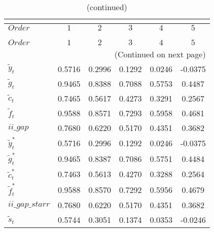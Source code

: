  
\begin{center}
\begin{longtable}{lccccc} 
\caption{COEFFICIENTS OF AUTOCORRELATION}\\
 \label{Table:th_autocorr_matrix}\\
\toprule 
$Order                    $	 & 	 $         1$	 & 	 $         2$	 & 	 $         3$	 & 	 $         4$	 & 	 $         5$\\
\midrule \endfirsthead 
\caption{(continued)}\\
 \toprule \\ 
$Order                    $	 & 	 $         1$	 & 	 $         2$	 & 	 $         3$	 & 	 $         4$	 & 	 $         5$\\
\midrule \endhead 
\midrule \multicolumn{6}{r}{(Continued on next page)} \\ \bottomrule \endfoot 
\bottomrule \endlastfoot 
${\tilde y_t}             $	 & 	    0.5716	 & 	    0.2996	 & 	    0.1292	 & 	    0.0246	 & 	   -0.0375 \\ 
${\tilde g_t}             $	 & 	    0.9465	 & 	    0.8388	 & 	    0.7088	 & 	    0.5753	 & 	    0.4487 \\ 
${\tilde c_t}             $	 & 	    0.7465	 & 	    0.5617	 & 	    0.4273	 & 	    0.3291	 & 	    0.2567 \\ 
${\tilde f_t}             $	 & 	    0.9588	 & 	    0.8571	 & 	    0.7293	 & 	    0.5958	 & 	    0.4681 \\ 
$ii\_gap                  $	 & 	    0.7680	 & 	    0.6220	 & 	    0.5170	 & 	    0.4351	 & 	    0.3682 \\ 
${\tilde y_t^*}           $	 & 	    0.5716	 & 	    0.2996	 & 	    0.1292	 & 	    0.0246	 & 	   -0.0375 \\ 
${\tilde g_t^*}           $	 & 	    0.9465	 & 	    0.8387	 & 	    0.7086	 & 	    0.5751	 & 	    0.4484 \\ 
${\tilde c_t^*}           $	 & 	    0.7463	 & 	    0.5613	 & 	    0.4270	 & 	    0.3288	 & 	    0.2564 \\ 
${\tilde f_t^*}           $	 & 	    0.9588	 & 	    0.8570	 & 	    0.7292	 & 	    0.5956	 & 	    0.4679 \\ 
$ii\_gap\_starr           $	 & 	    0.7680	 & 	    0.6220	 & 	    0.5170	 & 	    0.4351	 & 	    0.3682 \\ 
${\tilde s_t}             $	 & 	    0.5744	 & 	    0.3051	 & 	    0.1374	 & 	    0.0353	 & 	   -0.0246 \\ 

\end{longtable}
\end{center}
